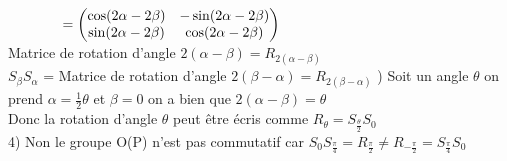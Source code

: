 \documentclass{article}
\newcommand\tab[1][1cm]{\hspace*{#1}}
\begin{document}
$\tab[1.35cm] = \begin{pmatrix}
    \cos(2 \alpha - 2 \beta) & -\sin(2 \alpha - 2 \beta)\\
    \sin(2 \alpha - 2 \beta) & \cos(2 \alpha - 2 \beta) \\
\end{pmatrix}$\\
Matrice de rotation d'angle $2 (\alpha - \beta) = R_{2(\alpha - \beta)}$\\
$S_\beta S_\alpha$ = Matrice de rotation d'angle $2 (\beta - \alpha) = R_{2(\beta - \alpha)}$
\newpage
{}) Soit un angle $\theta$ on prend $\alpha = \frac{1}{2} \theta$ et $\beta = 0$ on a bien que $2(\alpha - \beta) = \theta$\\
Donc la rotation d'angle $\theta$ peut être écris comme $R_{\theta} = S_{\frac{\theta}{2}} S_{0}$\\
4) Non le groupe O(P) n'est pas commutatif car $S_{0} S_{\frac{\pi}{4}} = R_{\frac{\pi}{2}} \neq R_{-\frac{\pi}{2}} = S_{\frac{\pi}{4}} S_{0}$
\end{document}
